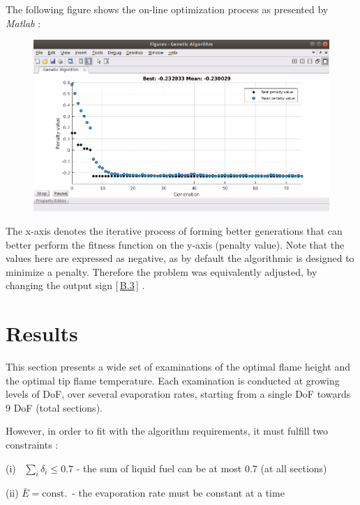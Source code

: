 \documentclass[12pt]{article}
\numberwithin{equation}{section}
\begin{document}
\begin{flushleft}
The following figure shows the on-line optimization process as presented by \textit{Matlab} : \vspace{0.5cm}

\begin{figure}[H]
\centering
\includegraphics[width=1.0 \linewidth, center]{Optimization_2.png}
\end{figure}

The x-axis denotes the iterative process of forming better generations that can better perform the fitness function on the y-axis (penalty value). Note that the values here are expressed as negative, as by default the algorithmic is designed to minimize a penalty. Therefore the problem was equivalently adjusted, by changing the output sign [\,\hyperlink{convex_concave}{B.3}\,] .
\newpage


\section{Results}
This section presents a wide set of examinations of the optimal flame height and the optimal tip flame temperature. Each examination is conducted at growing levels of DoF, over several evaporation rates, starting from a single DoF towards 9 DoF (total sections). 

However, in order to fit with the algorithm requirements, it must fulfill two constraints : 

\quad (i) \ $\sum_i \delta_i \leq 0.7$ - the sum of liquid fuel can be at most 0.7 (at all sections) 

\quad (ii) $\bar{E}=\text{const.}$ \,- the evaporation rate must be constant at a time


\end{flushleft}
\end{document}
